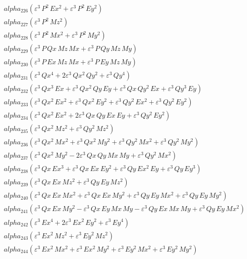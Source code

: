 \documentclass{article}
\begin{document}
\begin{align*}
  &\quad alpha_{226} \left(ε^{3}\,P^{2}\,Ex^{2} + ε^{3}\,P^{2}\,Ey^{2}\right) \\
  &\quad alpha_{227} \left(ε^{3}\,P^{2}\,Mz^{2}\right) \\
  &\quad alpha_{228} \left(ε^{3}\,P^{2}\,Mx^{2} + ε^{3}\,P^{2}\,My^{2}\right) \\
  &\quad alpha_{229} \left(ε^{3}\,P\,Qx\,Mz\,Mx + ε^{3}\,P\,Qy\,Mz\,My\right) \\
  &\quad alpha_{230} \left(ε^{3}\,P\,Ex\,Mz\,Mx + ε^{3}\,P\,Ey\,Mz\,My\right) \\
  &\quad alpha_{231} \left(ε^{3}\,Qx^{4} + 2ε^{3}\,Qx^{2}\,Qy^{2} + ε^{3}\,Qy^{4}\right) \\
  &\quad alpha_{232} \left(ε^{3}\,Qx^{3}\,Ex + ε^{3}\,Qx^{2}\,Qy\,Ey + ε^{3}\,Qx\,Qy^{2}\,Ex + ε^{3}\,Qy^{3}\,Ey\right) \\
  &\quad alpha_{233} \left(ε^{3}\,Qx^{2}\,Ex^{2} + ε^{3}\,Qx^{2}\,Ey^{2} + ε^{3}\,Qy^{2}\,Ex^{2} + ε^{3}\,Qy^{2}\,Ey^{2}\right) \\
  &\quad alpha_{234} \left(ε^{3}\,Qx^{2}\,Ex^{2} + 2ε^{3}\,Qx\,Qy\,Ex\,Ey + ε^{3}\,Qy^{2}\,Ey^{2}\right) \\
  &\quad alpha_{235} \left(ε^{3}\,Qx^{2}\,Mz^{2} + ε^{3}\,Qy^{2}\,Mz^{2}\right) \\
  &\quad alpha_{236} \left(ε^{3}\,Qx^{2}\,Mx^{2} + ε^{3}\,Qx^{2}\,My^{2} + ε^{3}\,Qy^{2}\,Mx^{2} + ε^{3}\,Qy^{2}\,My^{2}\right) \\
  &\quad alpha_{237} \left(ε^{3}\,Qx^{2}\,My^{2} - 2ε^{3}\,Qx\,Qy\,Mx\,My + ε^{3}\,Qy^{2}\,Mx^{2}\right) \\
  &\quad alpha_{238} \left(ε^{3}\,Qx\,Ex^{3} + ε^{3}\,Qx\,Ex\,Ey^{2} + ε^{3}\,Qy\,Ex^{2}\,Ey + ε^{3}\,Qy\,Ey^{3}\right) \\
  &\quad alpha_{239} \left(ε^{3}\,Qx\,Ex\,Mz^{2} + ε^{3}\,Qy\,Ey\,Mz^{2}\right) \\
  &\quad alpha_{240} \left(ε^{3}\,Qx\,Ex\,Mx^{2} + ε^{3}\,Qx\,Ex\,My^{2} + ε^{3}\,Qy\,Ey\,Mx^{2} + ε^{3}\,Qy\,Ey\,My^{2}\right) \\
  &\quad alpha_{241} \left(ε^{3}\,Qx\,Ex\,My^{2} -ε^{3}\,Qx\,Ey\,Mx\,My -ε^{3}\,Qy\,Ex\,Mx\,My + ε^{3}\,Qy\,Ey\,Mx^{2}\right) \\
  &\quad alpha_{242} \left(ε^{3}\,Ex^{4} + 2ε^{3}\,Ex^{2}\,Ey^{2} + ε^{3}\,Ey^{4}\right) \\
  &\quad alpha_{243} \left(ε^{3}\,Ex^{2}\,Mz^{2} + ε^{3}\,Ey^{2}\,Mz^{2}\right) \\
  &\quad alpha_{244} \left(ε^{3}\,Ex^{2}\,Mx^{2} + ε^{3}\,Ex^{2}\,My^{2} + ε^{3}\,Ey^{2}\,Mx^{2} + ε^{3}\,Ey^{2}\,My^{2}\right) \\

\end{align*}
\end{document}
